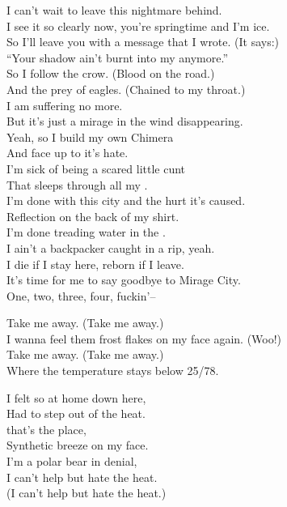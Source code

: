 I can't wait to leave this nightmare behind. \\
I see it so clearly now, you're springtime and I'm ice. \\
So I'll leave you with a message that I wrote. (It says:) \\
``Your shadow ain't burnt into my  anymore.'' \\

So I follow the crow. (Blood on the road.) \\
And the prey of eagles. (Chained to my throat.) \\
I am suffering no more. \\
But it's just a mirage in the wind disappearing. \\

Yeah, so I build my own Chimera \\
And face up to it's hate. \\
I'm sick of being a scared little cunt \\
That sleeps through all my . \\
I'm done with this city and the hurt it's caused. \\

Reflection on the back of my shirt. \\
I'm done treading water in the . \\
I ain't a backpacker caught in a rip, yeah. \\
I die if I stay here, reborn if I leave. \\
It's time for me to say goodbye to Mirage City. \\

One, two, three, four, fuckin'--




Take me away. (Take me away.) \\
I wanna feel them frost flakes on my face again. (Woo!) \\
Take me away. (Take me away.) \\
Where the temperature stays below 25/78. \\


I felt so at home down here, \\
Had to step out of the heat. \\
 that's the place, \\
Synthetic breeze on my face. \\
I'm a polar bear in denial, \\
I can't help but hate the heat. \\
(I can't help but hate the heat.) \\

